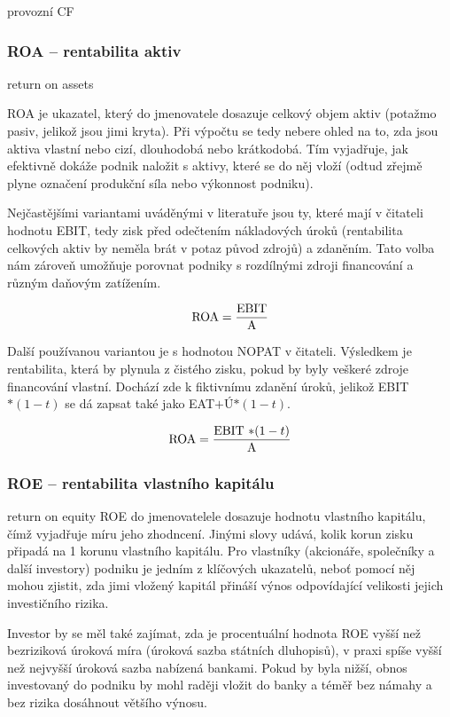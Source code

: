 provozní CF

\subsubsection{ROA -- rentabilita aktiv}

return on assets

ROA je ukazatel, který do jmenovatele dosazuje celkový objem aktiv (potažmo pasiv, jelikož jsou jimi kryta). Při výpočtu se tedy nebere ohled na to, zda jsou aktiva vlastní nebo cizí, dlouhodobá nebo krátkodobá. Tím vyjadřuje, jak efektivně dokáže podnik naložit s aktivy, které se do něj vloží (odtud zřejmě plyne označení produkční síla nebo výkonnost podniku).

Nejčastějšími variantami uváděnými v literatuře jsou ty, které mají v čitateli hodnotu EBIT, tedy zisk před odečtením nákladových úroků (rentabilita celkových aktiv by neměla brát v potaz původ zdrojů) a zdaněním. Tato volba nám zároveň umožňuje porovnat podniky s rozdílnými zdroji financování a různým daňovým zatížením.

$$\text{ROA} = \dfrac{\text{EBIT}}{\text{A}}$$

Další používanou variantou je s hodnotou NOPAT v čitateli. Výsledkem je rentabilita, která by plynula z čistého zisku, pokud by byly veškeré zdroje financování vlastní. Dochází zde k fiktivnímu zdanění úroků, jelikož EBIT$*(1-t)$ se dá zapsat také jako EAT$+$Ú$*(1-t)$.

$$\text{ROA} = \dfrac{\text{EBIT $*(1-t)$}}{\text{A}}$$ 


\subsubsection{ROE -- rentabilita vlastního kapitálu}

return on equity
ROE do jmenovatelele dosazuje hodnotu vlastního kapitálu, čímž vyjadřuje míru jeho zhodncení. Jinými slovy udává, kolik korun zisku připadá na 1 korunu vlastního kapitálu. Pro vlastníky (akcionáře, společníky a další investory) podniku je jedním z klíčových ukazatelů, neboť pomocí něj mohou zjistit, zda jimi vložený kapitál přináší výnos odpovídající velikosti jejich investičního rizika\cite{sedl}.

Investor by se měl také zajímat, zda je procentuální hodnota ROE vyšší než bezriziková úroková míra (úroková sazba státních dluhopisů), v praxi spíše vyšší než nejvyšší úroková sazba nabízená bankami. Pokud by byla nižší, obnos investovaný do podniku by mohl raději vložit do banky a téměř bez námahy a bez rizika dosáhnout většího výnosu.


